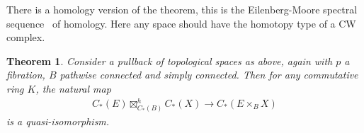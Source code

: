 \documentclass{scrartcl}
\theoremstyle{plain}
\newtheorem{theorem}{Theorem}[section]
\theoremstyle{definition}
\begin{document}

There is a homology version of the theorem, this is the Eilenberg-Moore spectral sequence~\cite{eilenberg1966homology} of homology. Here any space should have the homotopy type of a CW complex.

\begin{theorem}
    Consider a pullback of topological spaces as above, again with $p$ a fibration, $B$ pathwise connected and simply connected. Then for any commutative ring $K$, the natural map
    \begin{align*}
        C_*(E)\boxtimes_{C_*(B)}^h C_*(X) \to C_*(E\times_B X)
    \end{align*}
    is a quasi-isomorphism.
\end{theorem}

\end{document}
